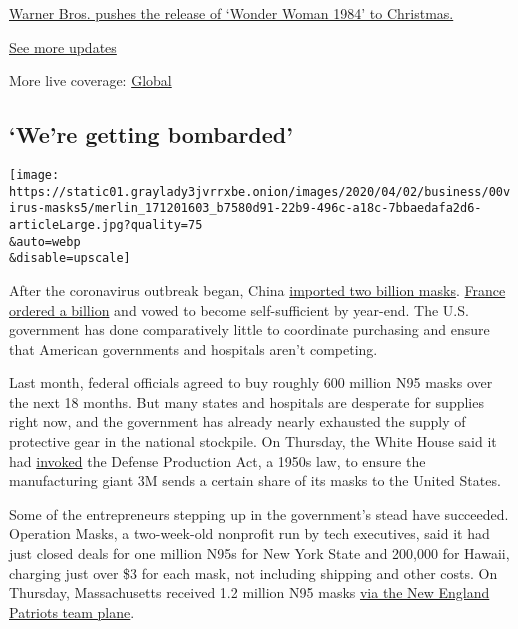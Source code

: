 \href{https://www.nytimes3xbfgragh.onion/live/2020/09/11/business/stock-market-today-coronavirus?action=click\&pgtype=Article\&state=default\&region=MAIN_CONTENT_1\&context=storylines_live_updates\#warner-bros-pushes-the-release-of-wonder-woman-1984-to-christmas}{Warner
Bros. pushes the release of `Wonder Woman 1984' to Christmas.}

\href{https://www.nytimes3xbfgragh.onion/live/2020/09/11/business/stock-market-today-coronavirus?action=click\&pgtype=Article\&state=default\&region=MAIN_CONTENT_1\&context=storylines_live_updates}{See
more updates}

More live coverage:
\href{https://www.nytimes3xbfgragh.onion/2020/09/11/world/covid-19-coronavirus.html?action=click\&pgtype=Article\&state=default\&region=MAIN_CONTENT_1\&context=storylines_live_updates}{Global}

\hypertarget{were-getting-bombarded}{%
\subsection{`We're getting bombarded'}\label{were-getting-bombarded}}

\texttt{[image: https://static01.graylady3jvrrxbe.onion/images/2020/04/02/business/00virus-masks5/merlin\_171201603\_b7580d91-22b9-496c-a18c-7bbaedafa2d6-articleLarge.jpg?quality=75\\\&auto=webp\\\&disable=upscale]}

After the coronavirus outbreak began, China
\href{https://www.nytimes3xbfgragh.onion/2020/04/01/business/coronavirus-china-masks.html}{imported
two billion masks}.
\href{https://www.nytimes3xbfgragh.onion/reuters/2020/03/31/world/europe/31reuters-health-coronavirus-france-masks.html}{France
ordered a billion} and vowed to become self-sufficient by year-end. The
U.S. government has done comparatively little to coordinate purchasing
and ensure that American governments and hospitals aren't competing.

Last month, federal officials agreed to buy roughly 600 million N95
masks over the next 18 months. But many states and hospitals are
desperate for supplies right now, and the government has already nearly
exhausted the supply of protective gear in the national stockpile. On
Thursday, the White House said it had
\href{https://www.nytimes3xbfgragh.onion/2020/04/02/world/coronavirus-live-news-updates.html\#link-711303f6}{invoked}
the Defense Production Act, a 1950s law, to ensure the manufacturing
giant 3M sends a certain share of its masks to the United States.

Some of the entrepreneurs stepping up in the government's stead have
succeeded. Operation Masks, a two-week-old nonprofit run by tech
executives, said it had just closed deals for one million N95s for New
York State and 200,000 for Hawaii, charging just over \$3 for each mask,
not including shipping and other costs. On Thursday, Massachusetts
received 1.2 million N95 masks
\href{https://www.wsj.com/articles/a-million-n95-masks-are-coming-from-chinaon-board-the-new-england-patriots-plane-11585821600}{via
the New England Patriots team plane}.


